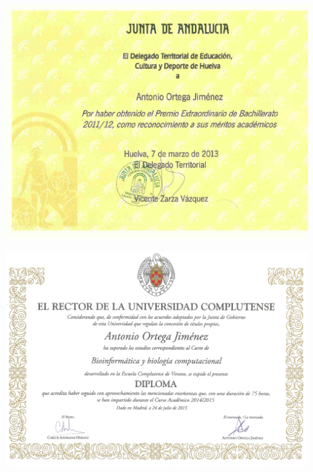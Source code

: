 %


\thispagestyle{empty}
\hypertarget{premio_extraordinario}{}
\begin{landscape}
\centering
\includegraphics[scale=0.9]{./premio_extraordinario.pdf}
\end{landscape}
\restoregeometry
\clearpage


\thispagestyle{empty}

\hypertarget{complu}{}
\begin{landscape}
\centering
\includegraphics[scale=0.2]{./bioinformatica2.jpg}
\end{landscape}
\restoregeometry
\clearpage


